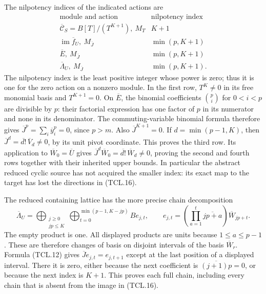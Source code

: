 The nilpotency indices of the indicated actions are
\[
 \begin{array}{c|c}
 \text{module and action}&\text{nilpotency index}\\ \hline
 \overline{\mathcal C}_S=B[T]/(T^{K+1}),\ M_T&K+1\\
 \operatorname{im}\overline f_U,\ M_{\overline J}
           &\min(p,K+1)\\
 \overline E,\ M_{\overline J}&\min(p,K+1)\\
 \overline\Lambda_U,\ M_{\overline J}&\min(p,K+1).
 \end{array}
 \tag{TCL.17}\label{CFStage:eq:tcl-indices}
\]
The nilpotency index is the least positive integer whose power is
zero; thus it is one for the zero action on a nonzero module.
In the first row, \(T^K\ne0\) in its free monomial basis and
\(T^{K+1}=0\). On \(\overline E\), the binomial coefficients
\(\binom pi\) for \(0<i<p\) are divisible by \(p\): their
factorial expression has one factor of \(p\) in its numerator
and none in its denominator. The commuting-variable binomial
formula therefore gives
\(\overline J^p=\sum_i\overline y_i^p=0\), since \(p>m\).
Also \(\overline J^{K+1}=0\). If
\(d=\min(p-1,K)\), then
\(\overline J^d=\overline{d!}\,\overline V_d\ne0\), by its
unit pivot coordinate. This proves the third row. Its application
to \(\overline W_0=\overline U\) gives
\(\overline J^d\overline W_0
=\overline{d!}\,\overline W_d\ne0\), proving the second and
fourth rows together with their inherited upper bounds.
In particular the abstract reduced cyclic source has not acquired
the smaller index: its exact map to the target has lost the
directions in (TCL.16).

The reduced containing lattice has the more precise chain decomposition
\[
 \overline\Lambda_U=
 \bigoplus_{\substack{j\geq0\\jp\leq K}}
       \bigoplus_{t=0}^{\min(p-1,K-jp)} B e_{j,t},\qquad
 e_{j,t}=\left(\prod_{a=1}^t\overline{jp+a}\right)
                          \overline W_{jp+t}.
 \tag{TCL.18}\label{CFStage:eq:tcl-divided-chains}
\]
The empty product is one. All displayed products are units because
\(1\leq a\leq p-1\). These are therefore changes of basis on
disjoint intervals of the basis \(\overline W_r\). Formula
(TCL.12) gives \(\overline J e_{j,t}=e_{j,t+1}\) except at the
last position of a displayed interval. There it is zero, either
because the next coefficient is \(\overline{(j+1)p}=0\), or
because the next index is \(K+1\). This proves each full chain,
including every chain that is absent from the image in (TCL.16).

